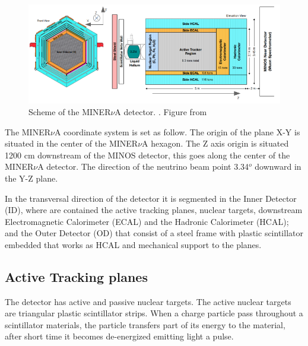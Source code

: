 \begin{figure}[!htb]
\centering
\includegraphics[scale=0.5]{Figures/Chapter2/DetectorScheme.png}

        \caption{Scheme of the MINER$\nu$A detector. . Figure from \cite{ALIAGA2014130}} 
\label{fig:MnvExp:MnvDetector:Scheme}
\end{figure}

The MINER$\nu$A coordinate system is set as follow. The origin of the plane X-Y is situated in the center of the MINER$\nu$A hexagon. The Z axis origin is situated 1200 cm downstream of the MINOS detector, this goes along the center of the MINER$\nu$A detector. The direction of the neutrino beam point 3.34$^o$ downward in the Y-Z plane. 

In the transversal direction of the detector it is segmented in the Inner Detector (ID), where are contained the active tracking planes, nuclear targets, downstream Electromagnetic Calorimeter (ECAL) and the Hadronic Calorimeter (HCAL); and the Outer Detector (OD) that consist of a steel frame with plastic scintillator embedded that works as HCAL and mechanical support to the planes.   

\subsection{Active Tracking planes}
\label{Cap:MnvExp:MnvDetector:ActiveTrackingPlanes}

The detector has active and passive nuclear targets. The active nuclear targets are triangular plastic scintillator strips. When a charge particle pass throughout a scintillator materials, the particle transfers part of its energy to the material, after short time it becomes de-energized emitting light a pulse\cite{DetectionTechniques}. 

